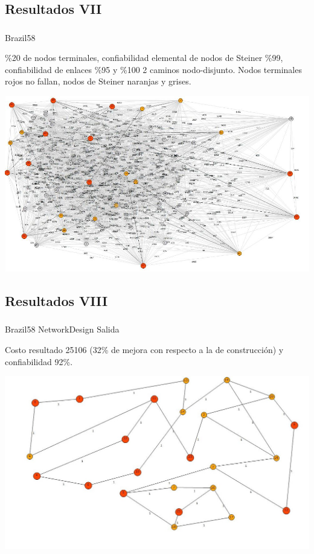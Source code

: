 \subsection{Resultados VII}
\begin{frame}\frametitle{}
\begin{block}{Brazil58}
\begin{scriptsize}
\%20 de nodos terminales, confiabilidad elemental de nodos de Steiner \%99, confiabilidad de enlaces \%95 y \%100 2 caminos nodo-disjunto. Nodos terminales rojos no fallan, nodos de Steiner naranjas y grises.
\end{scriptsize}
\begin{center}
   \includegraphics[scale=0.35]{figuras/1}
\end{center}
\end{block}
\end{frame}

\subsection{Resultados VIII}
\begin{frame}\frametitle{}
\begin{block}{Brazil58 NetworkDesign Salida}
\begin{scriptsize}
Costo resultado 25106 (32\% de mejora con respecto a la de construcción) y confiabilidad 92\%. 
\end{scriptsize}
\begin{center}
   \includegraphics[scale=0.35]{figuras/2}
\end{center}
\end{block}
\end{frame}

